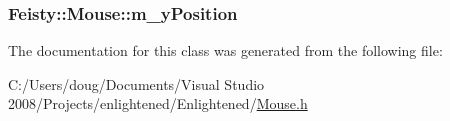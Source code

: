\label{class_feisty_1_1_mouse_a57c3e21679268866baf51dc697ea682a}
\hypertarget{class_feisty_1_1_mouse_ac066192462fc496bd68f47c5bcfee6e4}{
\subsubsection[{m\_\-yPosition}]{ {\bf Feisty::Mouse::m\_\-yPosition}}}
\label{class_feisty_1_1_mouse_ac066192462fc496bd68f47c5bcfee6e4}


The documentation for this class was generated from the following file:\begin{DoxyCompactItemize}
\item 
C:/Users/doug/Documents/Visual Studio 2008/Projects/enlightened/Enlightened/\hyperlink{_mouse_8h}{Mouse.h}\end{DoxyCompactItemize}

